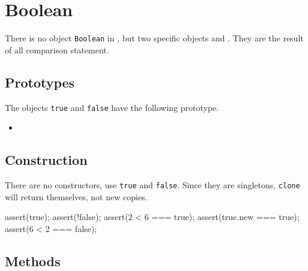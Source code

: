 \section{Boolean}

There is no object \lstinline|Boolean| in \us, but two specific
objects  and .  They are the result of
all comparison statement.


\subsection{Prototypes}

The objects \lstinline|true| and \lstinline|false| have the following
prototype.

\begin{itemize}
\item {}
\end{itemize}

\subsection{Construction}

There are no constructors, use \lstinline|true| and \lstinline|false|.
Since they are singletons, \lstinline|clone| will return themselves,
not new copies.

\begin{urbiscript}
assert(true);
assert(!false);
assert(2 < 6 === true);
assert(true.new === true);
assert(6 < 2 === false);
\end{urbiscript}

\subsection{Methods}

